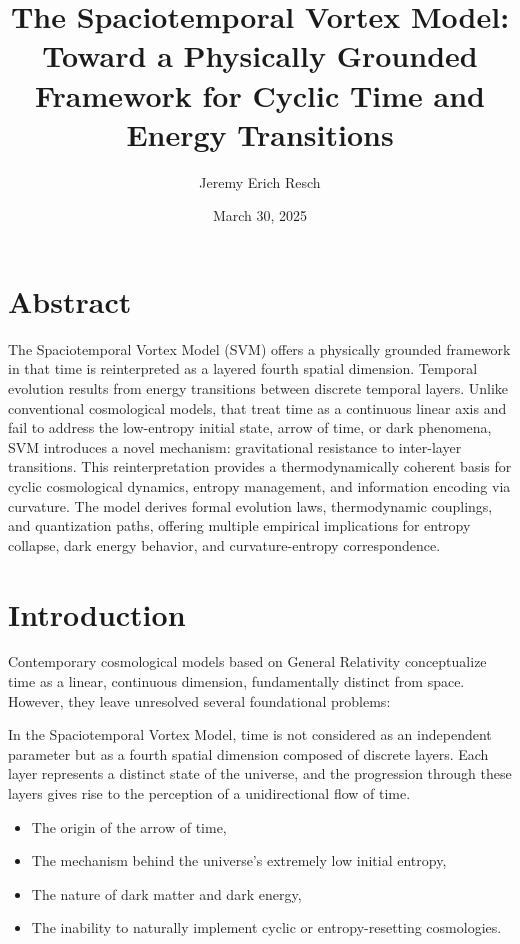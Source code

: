 \documentclass[11pt]{article}
\title{The Spaciotemporal Vortex Model: Toward a Physically Grounded Framework for Cyclic Time and Energy Transitions}
\author{Jeremy Erich Resch}
\date{March 30, 2025}
\begin{document}
\maketitle

\section*{Abstract}

The Spaciotemporal Vortex Model (SVM) offers a physically grounded framework in that time is reinterpreted as a layered fourth spatial dimension. Temporal evolution results from energy transitions between discrete temporal layers. Unlike conventional cosmological models, that treat time as a continuous linear axis and fail to address the low-entropy initial state, arrow of time, or dark phenomena, SVM introduces a novel mechanism: gravitational resistance to inter-layer transitions. This reinterpretation provides a thermodynamically coherent basis for cyclic cosmological dynamics, entropy management, and information encoding via curvature. The model derives formal evolution laws, thermodynamic couplings, and quantization paths, offering multiple empirical implications for entropy collapse, dark energy behavior, and curvature-entropy correspondence.

\section{Introduction}

Contemporary cosmological models based on General Relativity conceptualize time as a linear, continuous dimension, fundamentally distinct from space. However, they leave unresolved several foundational problems:

In the Spaciotemporal Vortex Model, time is not considered as an independent parameter but as a fourth spatial dimension composed of discrete layers. Each layer represents a distinct state of the universe, and the progression through these layers gives rise to the perception of a unidirectional flow of time.

\begin{itemize}
    \item The origin of the arrow of time,
    \item The mechanism behind the universe's extremely low initial entropy,
    \item The nature of dark matter and dark energy,
    \item The inability to naturally implement cyclic or entropy-resetting cosmologies.
\end{itemize}
\end{document}
